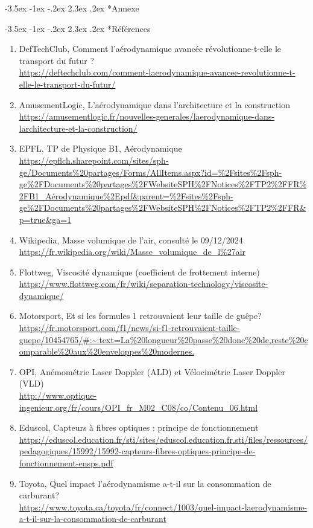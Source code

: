 \documentclass[a4paper, 12pt,oneside]{article}
\makeatletter
\renewcommand{\section}{\@startsection {section}{1}{\z@}%
             {-3.5ex \@plus -1ex \@minus -.2ex}%
             {2.3ex \@plus.2ex}%
             {\normalfont\normalsize\bfseries}}
\renewcommand{\subsection}{\@startsection {subsection}{1}{\z@}%
             {-3.5ex \@plus -1ex \@minus -.2ex}%
             {2.3ex \@plus.2ex}%
             {\normalfont\normalsize\bfseries}}
\makeatother
\begin{document}
\section*{Annexe}

\subsection*{Références}
\renewcommand{\labelenumi}{[\theenumi]}
\begin{enumerate}

    \item \label{ref1} DefTechClub, Comment l’aérodynamique avancée révolutionne-t-elle le transport du futur ?\\
    \url{https://deftechclub.com/comment-laerodynamique-avancee-revolutionne-t-elle-le-transport-du-futur/}
    \item \label{ref2} AmusementLogic, L’aérodynamique dans l’architecture et la construction\\
    \url{https://amusementlogic.fr/nouvelles-generales/laerodynamique-dans-larchitecture-et-la-construction/}
    \item \label{ref3} EPFL, TP de Physique B1, Aérodynamique
    \url{https://epflch.sharepoint.com/sites/sph-ge/Documents%20partages/Forms/AllItems.aspx?id=%2Fsites%2Fsph-ge%2FDocuments%20partages%2FWebsiteSPH%2FNotices%2FTP2%2FFR%2FB1_Aérodynamique%2Epdf&parent=%2Fsites%2Fsph-ge%2FDocuments%20partages%2FWebsiteSPH%2FNotices%2FTP2%2FFR&p=true&ga=1}
    \item \label{ref4} Wikipedia, Masse volumique de l'air, consulté le 09/12/2024
    \url{https://fr.wikipedia.org/wiki/Masse_volumique_de_l%27air}
    \item \label{ref5}Flottweg, Viscosité dynamique (coefficient de frottement interne)\\
    \url{https://www.flottweg.com/fr/wiki/separation-technology/viscosite-dynamique/}
    \item \label{ref6} Motorsport, Et si les formules 1 retrouvaient leur taille de guêpe?\\
    \url{https://fr.motorsport.com/f1/news/si-f1-retrouvaient-taille-guepe/10454765/#:~:text=La%20longueur%20passe%20donc%20de,reste%20comparable%20aux%20enveloppes%20modernes.}
    \item \label{ref7} OPI, Anémométrie Laser Doppler (ALD) et Vélocimétrie Laser Doppler (VLD)\\
    \url{http://www.optique-ingenieur.org/fr/cours/OPI_fr_M02_C08/co/Contenu_06.html}
    \item \label{ref8} Eduscol, Capteurs à fibres optiques : principe de fonctionnement\\
    \url{https://eduscol.education.fr/sti/sites/eduscol.education.fr.sti/files/ressources/pedagogiques/15992/15992-capteurs-fibres-optiques-principe-de-fonctionnement-ensps.pdf}
    \item \label{ref9} Toyota, Quel impact l’aérodynamisme a-t-il sur la consommation de carburant?\\
    \url{https://www.toyota.ca/toyota/fr/connect/1003/quel-impact-laerodynamisme-a-t-il-sur-la-consommation-de-carburant}


\end{enumerate}
\end{document}
